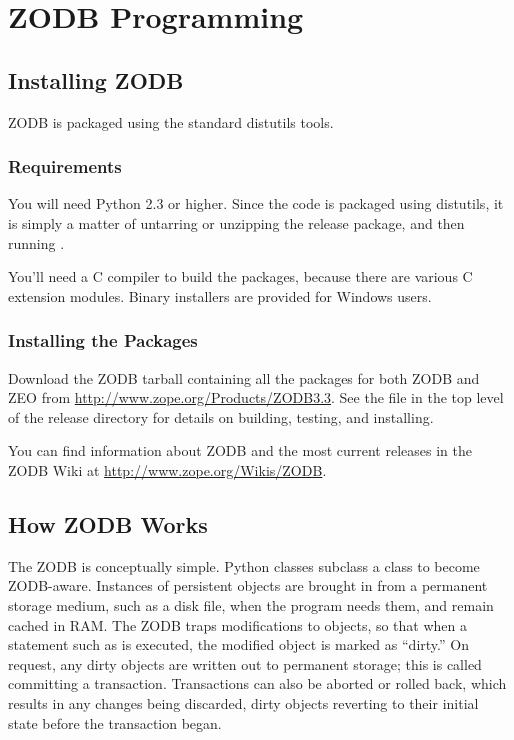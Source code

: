 
   

\section{ZODB Programming}

\subsection{Installing ZODB}

ZODB is packaged using the standard distutils tools.

\subsubsection{Requirements}

You will need Python 2.3 or higher.  Since the code is packaged using
distutils, it is simply a matter of untarring or unzipping the release
package, and then running .

You'll need a C compiler to build the packages, because there are
various C extension modules.  Binary installers are provided for
Windows users.

\subsubsection{Installing the Packages}

Download the ZODB tarball containing all the packages for both ZODB
and ZEO from \url{http://www.zope.org/Products/ZODB3.3}.  See
the  file in the top level of the release directory
for details on building, testing, and installing.

You can find information about ZODB and the most current releases in
the ZODB Wiki at \url{http://www.zope.org/Wikis/ZODB}.

\subsection{How ZODB Works}

The ZODB is conceptually simple.  Python classes subclass a 
 class to become ZODB-aware. 
Instances of persistent objects are brought in from a permanent
storage medium, such as a disk file, when the program needs them, and
remain cached in RAM.  The ZODB traps modifications to objects, so
that when a statement such as  is executed, the
modified object is marked as ``dirty.''  On request, any dirty objects
are written out to permanent storage; this is called committing a
transaction.  Transactions can also be aborted or rolled back, which
results in any changes being discarded, dirty objects reverting to
their initial state before the transaction began.

